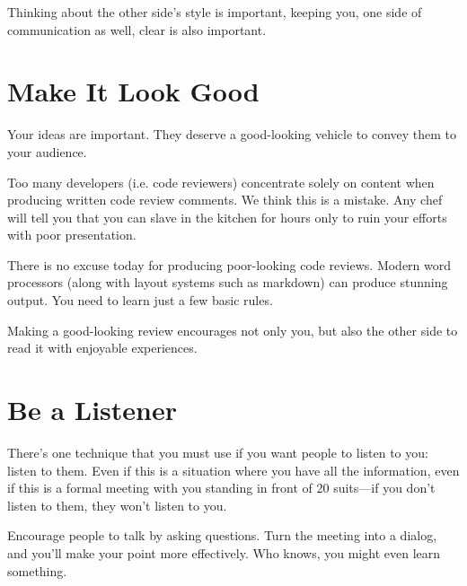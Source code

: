 Thinking about the other side's style is important, keeping you, one side of communication as well, clear is also important.

\section{Make It Look Good}

Your ideas are important. They deserve a good-looking vehicle to convey them to your audience.

Too many developers (i.e. code reviewers) concentrate solely on content when producing written code review comments. We think this is a mistake. Any chef will tell you that you can slave in the kitchen for hours only to ruin your efforts with poor presentation.

There is no excuse today for producing poor-looking code reviews. Modern word processors (along with layout systems such as markdown) can produce stunning output. You need to learn just a few basic rules.

Making a good-looking review encourages not only you, but also the other side to read it with enjoyable experiences.

\section{Be a Listener}

There’s one technique that you must use if you want people to listen to you: listen to them. Even if this is a situation where you have all the information, even if this is a formal meeting with you standing in front of 20 suits—if you don’t listen to them, they won’t listen to you.

Encourage people to talk by asking questions. Turn the meeting into a dialog, and you’ll make your point more effectively. Who knows, you might even learn something.


